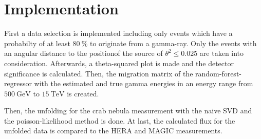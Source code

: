 \section{Implementation}
\label{sec:durch}
First a data selection is implemented 
including only events which have a probabilty of at least $\SI{80}{\percent}$ to
originate from a gamma-ray.
Only the events with an angular distance to the positionof the source of $\theta^2 \leq \num{0.025}$ are taken into consideration.
Afterwards, a theta-squared plot is made and the detector significance is calculated.
Then, the migration matrix of the random-forest-regressor with the estimated and true gamma energies in an 
energy range from $\SI{500}{\giga\electronvolt}$ to $\SI{15}{\tera\electronvolt}$ is created. \par

Then, the unfolding for the crab nebula measurement with the naive SVD and the poisson-likelihood method is done.
At last, the calculated flux for the unfolded data is compared to the HERA and MAGIC measurements.
